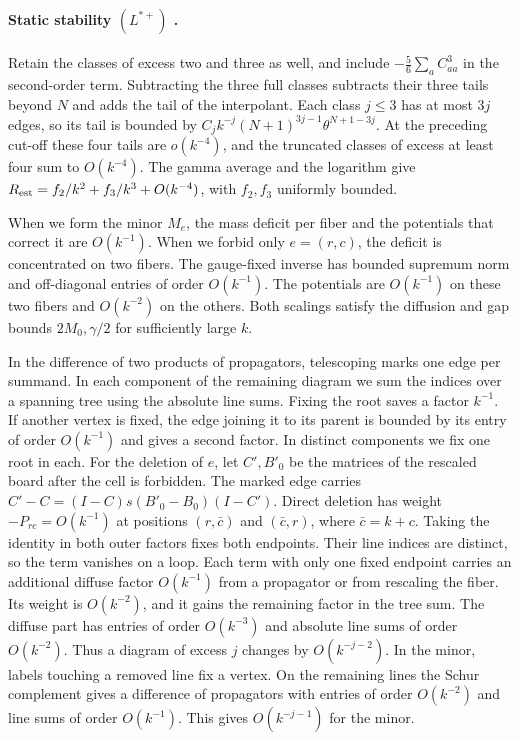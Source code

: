 \paragraph{Static stability $(L^{*+})$ .}
Retain the classes of excess two and three as well, and include $-\frac56\sum_a C_{aa}^3$ in the
second-order term. Subtracting the three full classes subtracts their three tails beyond $N$ and
adds the tail of the interpolant. Each class $j\le3$ has at most $3j$ edges, so its tail is
bounded by $C_j k^{-j}(N+1)^{3j-1}\theta^{N+1-3j}$. At the preceding cut-off these four tails are
$o(k^{-4})$, and the truncated classes of excess at least four sum to $O(k^{-4})$. The gamma
average and the logarithm give $R_{\rm est}=f_2/k^2+f_3/k^3+O(k^{-4})$, with $f_2,f_3$ uniformly
bounded.

When we form the minor $M_e$, the mass deficit per fiber and the potentials that correct it are
$O(k^{-1})$. When we forbid only $e=(r,c)$, the deficit is concentrated on two fibers. The
gauge-fixed inverse has bounded supremum norm and off-diagonal entries of order $O(k^{-1})$. The
potentials are $O(k^{-1})$ on these two fibers and $O(k^{-2})$ on the others. Both scalings
satisfy the diffusion and gap bounds $2M_0,\gamma/2$ for sufficiently large $k$.

In the difference of two products of propagators, telescoping marks one edge per summand. In each
component of the remaining diagram we sum the indices over a spanning tree using the absolute line
sums. Fixing the root saves a factor $k^{-1}$. If another vertex is fixed, the edge joining it to
its parent is bounded by its entry of order $O(k^{-1})$ and gives a second factor. In distinct
components we fix one root in each. For the deletion of $e$, let $C',B'_0$ be the matrices of the
rescaled board after the cell is forbidden. The marked edge carries $C'-C=(I-C)s(B'_0-B_0)(I-C')$.
Direct deletion has weight $-P_{rc}=O(k^{-1})$ at positions $(r,\bar c)$ and $(\bar c,r)$, where
$\bar c=k+c$. Taking the identity in both outer factors fixes both endpoints. Their line indices
are distinct, so the term vanishes on a loop. Each term with only one fixed endpoint carries an
additional diffuse factor $O(k^{-1})$ from a propagator or from rescaling the fiber. Its weight is
$O(k^{-2})$, and it gains the remaining factor in the tree sum. The diffuse part has entries of
order $O(k^{-3})$ and absolute line sums of order $O(k^{-2})$. Thus a diagram of excess $j$
changes by $O(k^{-j-2})$. In the minor, labels touching a removed line fix a vertex. On the
remaining lines the Schur complement gives a difference of propagators with entries of order
$O(k^{-2})$ and line sums of order $O(k^{-1})$. This gives $O(k^{-j-1})$ for the minor.


